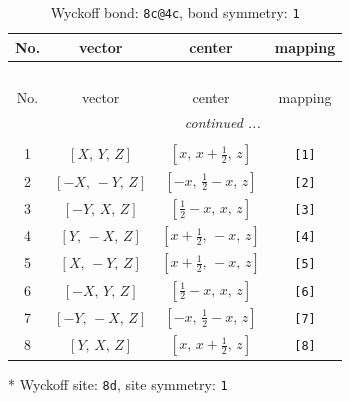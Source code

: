 \documentclass[fleqn,8pt]{jsarticle}
\begin{document}
\renewcommand{\arraystretch}{1.2}
\begin{longtable}{cccc}
\caption{Wyckoff bond: {\tt 8c@4c}, bond symmetry: {\tt 1}}
 \\
 \hline \hline
No. & vector & center & mapping \\ \hline \endfirsthead

\multicolumn{3}{l}{\tablename\ \thetable{}} \\
 \hline \hline
No. & vector & center & mapping \\ \hline \endhead

 \hline \hline
\multicolumn{3}{r}{\footnotesize\it continued ...} \\ \endfoot

 \hline \hline
\multicolumn{3}{r}{} \\ \endlastfoot

1 & $\left[ X,\, Y,\, Z \right]$ & $\left[ x,\, x + \frac{1}{2},\, z \right]$ & {\tt [1]} \\ \hline
2 & $\left[ - X,\, - Y,\, Z \right]$ & $\left[ - x,\, \frac{1}{2} - x,\, z \right]$ & {\tt [2]} \\ \hline
3 & $\left[ - Y,\, X,\, Z \right]$ & $\left[ \frac{1}{2} - x,\, x,\, z \right]$ & {\tt [3]} \\ \hline
4 & $\left[ Y,\, - X,\, Z \right]$ & $\left[ x + \frac{1}{2},\, - x,\, z \right]$ & {\tt [4]} \\ \hline
5 & $\left[ X,\, - Y,\, Z \right]$ & $\left[ x + \frac{1}{2},\, - x,\, z \right]$ & {\tt [5]} \\ \hline
6 & $\left[ - X,\, Y,\, Z \right]$ & $\left[ \frac{1}{2} - x,\, x,\, z \right]$ & {\tt [6]} \\ \hline
7 & $\left[ - Y,\, - X,\, Z \right]$ & $\left[ - x,\, \frac{1}{2} - x,\, z \right]$ & {\tt [7]} \\ \hline
8 & $\left[ Y,\, X,\, Z \right]$ & $\left[ x,\, x + \frac{1}{2},\, z \right]$ & {\tt [8]} \\
\end{longtable}
* Wyckoff site: {\tt 8d}, site symmetry: {\tt 1}
\renewcommand{\arraystretch}{1.2}
\end{document}
